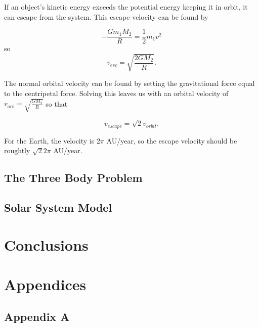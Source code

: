 \documentclass[%
oneside,                 %
final,                   %
10pt]{article}
\begin{document}
If an object's kinetic energy exceeds the potential energy keeping it in orbit, it can escape from the system.  This escape velocity can be found by

\[
-\frac{G m_1 M_2}{R}=\frac{1}{2}m_1 v^2
\]
so 
\[
v_{esc}=\sqrt{\frac{2GM_2}{R}}.
\]

The normal orbital velocity can be found by setting the gravitational force equal to the centripetal force.  Solving this leaves us with an orbital velocity of $v_{orb}=\sqrt{\frac{GM_2}{R}}$ so that

\[
v_{escape}=\sqrt{2}v_{orbit}.
\]

For the Earth, the velocity is $2 \pi$ AU/year, so the escape velocity should be roughtly $\sqrt{2}2\pi$ AU/year.

\subsection{The Three Body Problem}

\subsection{Solar System Model}


\section{Conclusions}


\section{Appendices}

\subsection{Appendix A} \label{A}
\end{document}

